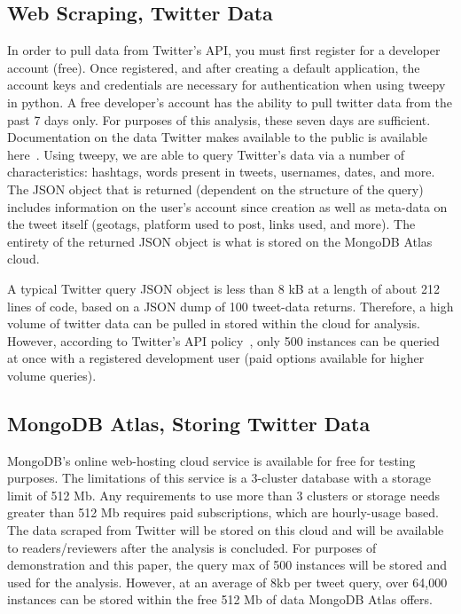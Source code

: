 \subsection{Web Scraping, Twitter Data}

In order to pull data from Twitter's API, you must first register for a
developer account (free). Once registered, and after creating a default
application, the account keys and credentials are necessary for authentication
when using tweepy in python. A free developer's account has the ability to pull
twitter data from the past 7 days only. For purposes of this analysis, these
seven days are sufficient. Documentation on the data Twitter makes available to
the public is available here~\cite{TwitterAPI}. Using tweepy, we are able to
query Twitter's data via a number of characteristics: hashtags, words present
in tweets, usernames, dates, and more. The JSON object that is returned
(dependent on the structure of the query) includes information on the user's
account since creation as well as meta-data on the tweet itself (geotags,
platform used to post, links used, and more). The entirety of the returned JSON
object is what is stored on the MongoDB Atlas cloud.

A typical Twitter query JSON object is less than 8 kB at a length of about 212
lines of code, based on a JSON dump of 100 tweet-data returns. Therefore, a
high volume of twitter data can be pulled in stored within the cloud for
analysis.  However, according to Twitter's API
policy~\cite{TwitterRateLimiting}, only 500 instances can be queried at once
with a registered development user (paid options available for higher volume
queries).

\subsection{MongoDB Atlas, Storing Twitter Data}

MongoDB's online web-hosting cloud service is available for free for testing
purposes. The limitations of this service is a 3-cluster database with a
storage limit of 512 Mb. Any requirements to use more than 3 clusters or
storage needs greater than 512 Mb requires paid subscriptions, which are
hourly-usage based.  The data scraped from Twitter will be stored on this cloud
and will be available to readers/reviewers after the analysis is concluded. For
purposes of demonstration and this paper, the query max of 500 instances will
be stored and used for the analysis. However, at an average of 8kb per tweet
query, over 64,000 instances can be stored within the free 512 Mb of data
MongoDB Atlas offers.

